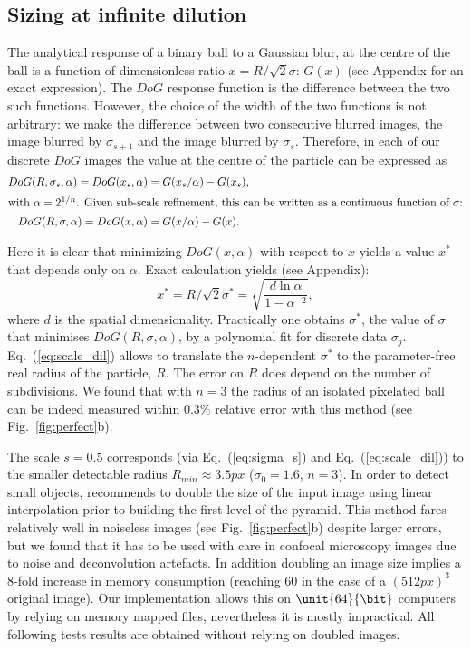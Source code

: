 \documentclass[8.5pt,twoside,twocolumn]{article}
\begin{document}
\subsection{Sizing at infinite dilution}
\label{sec:dilute}
The analytical response of a binary ball to a Gaussian blur, at the centre of the ball is a function of dimensionless ratio $x=R/\sqrt{2}\sigma$: $G(x)$ (see Appendix for an exact expression). The $DoG$ response function is the difference between the two such functions. However, the choice of the width of the two functions is not arbitrary: we make the difference between two consecutive blurred images, the image blurred by $\sigma_{s+1}$ and the image blurred by $\sigma_s$. Therefore, in each of our discrete $DoG$ images the value at the centre of the particle can be expressed as
\begin{align}
DoG(R,\sigma_s, \alpha) = DoG(x_s, \alpha) &= G(x_s/\alpha) - G(x_s),\\
\intertext{with $\alpha=2^{1/n}$. Given sub-scale refinement, this can be written as a continuous function of $\sigma$:}
DoG(R,\sigma, \alpha) = DoG(x, \alpha) &= G(x/\alpha) - G(x).
\end{align}

Here it is clear that minimizing $DoG(x, \alpha)$ with respect to $x$ yields a value $x^*$ that depends only on $\alpha$. Exact calculation yields (see Appendix):
\begin{equation}
	x^* = R/\sqrt{2}\sigma^* = \sqrt{\frac{d\ln \alpha}{1-\alpha^{-2}}}, 
	\label{eq:scale_dil}
\end{equation}
where $d$ is the spatial dimensionality. 
Practically one obtains $\sigma^*$, the value of $\sigma$ that minimises $DoG(R,\sigma, \alpha)$, by a polynomial fit for discrete data $\sigma_j$. Eq.~(\ref{eq:scale_dil}) allows to translate the $n$-dependent $\sigma^*$ to the parameter-free real radius of the particle, $R$. The error on $R$ does depend on the number of subdivisions. We found that with $n=3$ the radius of an isolated pixelated ball can be indeed measured within $0.3\%$ relative error with this method (see Fig.~\ref{fig:perfect}b).

The scale $s=0.5$ corresponds (via Eq.~(\ref{eq:sigma_s}) and Eq.~(\ref{eq:scale_dil})) to the smaller detectable radius $R_{min}\approx \unit{3.5}{px}$ ($\sigma_0=1.6$, $n=3$). In order to detect small objects, \citet{Lowe2004} recommends to double the size of the input image using linear interpolation prior to building the first level of the pyramid. This method fares relatively well in noiseless images (see Fig.~\ref{fig:perfect}b) despite larger errors, but we found that it has to be used with care in confocal microscopy images due to noise and deconvolution artefacts. In addition doubling an image size implies a 8-fold increase in memory consumption (reaching \unit{60}{\giga\byte} in the case of a $(\unit{512}{px})^3$ original image). Our implementation allows this on $\unit{64}{\bit}$ computers by relying on memory mapped files, nevertheless it is mostly impractical. All following tests results are obtained without relying on doubled images.
\end{document}
